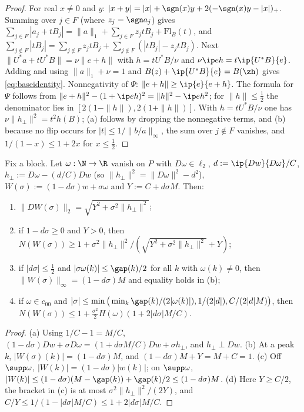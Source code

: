 \begin{proof}
For real $x\ne0$ and $y$: $|x+y|=|x|+\sgn(x)y+2(-\sgn(x)y-|x|)_+$.  Summing
over $j\in F$ (where $z_j=\sgn a_j$) gives
$\sum_{j\in F}|a_j+tB_j|=\|a\|_1+\sum_{j\in F}z_jtB_j+\mathrm{Fl}_B(t)$,
and $\sum_{j\notin F}|tB_j|=\sum_{j\notin F}z_jtB_j+\sum_{j\notin
F}(|tB_j|-z_jtB_j)$.  Next $\|U^*a+tU^*B\|=\nu\|e+h\|$ with $h=tU^*B/\nu$
and $\nu\ip eh=t\ip{U^*B}{e}$.  Adding and using $\|a\|_1+\nu=1$ and
$B(z)+\ip{U^*B}{e}=B(\zh)$ gives \eqref{eq:baseidentity}.  Nonnegativity of
$\Psi$: $\|e+h\|\ge\ip{e}{e+h}$.  The formula for $\Psi$ follows from
$\|e+h\|^2-(1+\ip eh)^2=\|h\|^2-\ip eh^2$; for $\|h\|\le\frac12$ the
denominator lies in $[2(1-\|h\|),2(1+\|h\|)]$.  With $h=tU^*B/\nu$ one has
$\nu\|h_\perp\|^2=t^2h(B)$; (a) follows by dropping the nonnegative terms,
and (b) because no flip occurs for $|t|\le1/\|b/a\|_\infty$, the sum over
$j\notin F$ vanishes, and $1/(1-x)\le1+2x$ for $x\le\frac12$.
\end{proof}

\begin{lemma}\label{lem:block}
Fix a block.  Let $\omega:\N\to\R$ vanish on $P$ with $D\omega\in\ell_2$,
$d:=\ip{Dw}{D\omega}/C$, $h_\perp:=D\omega-(d/C)Dw$ \textup{(}so
$\|h_\perp\|^2=\|D\omega\|^2-d^2$\textup{)}, $W(\sigma):=(1-d\sigma)w+
\sigma\omega$ and $Y:=C+d\sigma M$.  Then:
\begin{enumerate}
\item[(a)] $\|DW(\sigma)\|_2=\sqrt{Y^2+\sigma^2\|h_\perp\|^2}$;
\item[(b)] if $1-d\sigma\ge0$ and $Y>0$, then
$N(W(\sigma))\ge1+\sigma^2\|h_\perp\|^2/(\sqrt{Y^2+\sigma^2\|h_\perp\|^2}+Y)$;
\item[(c)] if $|d\sigma|\le\frac12$ and $|\sigma\omega(k)|\le\gap(k)/2$ for
all $k$ with $\omega(k)\ne0$, then $\|W(\sigma)\|_\infty=(1-d\sigma)M$ and
equality holds in \textup{(b)};
\item[(d)] if $\omega\in c_{00}$ and $|\sigma|\le\min\big(\min_{k}
\gap(k)/(2|\omega(k)|),1/(2|d|),C/(2|d|M)\big)$, then
$N(W(\sigma))\le1+\frac{\sigma^2}2H(\omega)(1+2|d\sigma|M/C)$.
\end{enumerate}
\end{lemma}

\begin{proof}
(a) Using $1/C-1=M/C$, $(1-d\sigma)Dw+\sigma D\omega=(1+d\sigma M/C)Dw
+\sigma h_\perp$, and $h_\perp\perp Dw$.  (b) At a peak $k$,
$|W(\sigma)(k)|=(1-d\sigma)M$, and $(1-d\sigma)M+Y=M+C=1$.  (c) Off
$\supp\omega$, $|W(k)|=(1-d\sigma)|w(k)|$; on $\supp\omega$,
$|W(k)|\le(1-d\sigma)(M-\gap(k))+\gap(k)/2\le(1-d\sigma)M$.  (d) Here $Y\ge
C/2$, the bracket in (c) is at most $\sigma^2\|h_\perp\|^2/(2Y)$, and
$C/Y\le1/(1-|d\sigma|M/C)\le1+2|d\sigma|M/C$.
\end{proof}

